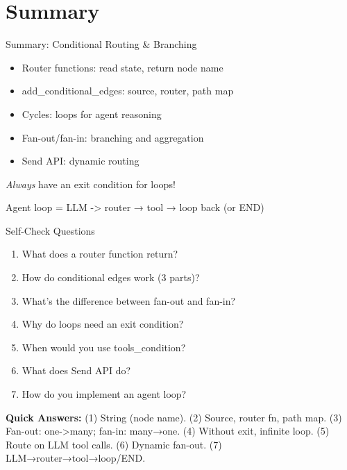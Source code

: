 \documentclass[aspectratio=169,11pt]{beamer}
\begin{document}
\section{Summary}
\begin{frame}[t,shrink=3]{Summary: Conditional Routing \& Branching}
\setlength{\itemsep}{1pt}
\vspace{0.05cm}

\begin{conceptbox}
\setlength{\itemsep}{0.5pt}
\begin{itemize}
  \item Router functions: read state, return node name
  \item add\_conditional\_edges: source, router, path map
  \item Cycles: loops for agent reasoning
  \item Fan-out/fan-in: branching and aggregation
  \item Send API: dynamic routing
\end{itemize}
\end{conceptbox}

\vspace{0.1cm}

\begin{warningbox}[Critical]
\textit{Always} have an exit condition for loops!
\end{warningbox}

\vspace{0.1cm}

\begin{tipbox}[Pattern]
Agent loop = LLM -> router → tool → loop back (or END)
\end{tipbox}
\end{frame}

\begin{frame}[t,shrink=5]{Self-Check Questions}
\setlength{\itemsep}{0pt}
\vspace{0.05cm}

{\footnotesize
\begin{enumerate}
\setlength{\itemsep}{0.5pt}
  \item What does a router function return?
  \item How do conditional edges work (3 parts)?
  \item What's the difference between fan-out and fan-in?
  \item Why do loops need an exit condition?
  \item When would you use tools\_condition?
  \item What does Send API do?
  \item How do you implement an agent loop?
\end{enumerate}

\vspace{0.05cm}

\textbf{Quick Answers:} (1) String (node name). (2) Source, router fn, path map. (3) Fan-out: one->many; fan-in: many→one. (4) Without exit, infinite loop. (5) Route on LLM tool calls. (6) Dynamic fan-out. (7) LLM→router→tool→loop/END.
}
\end{frame}
\end{document}
